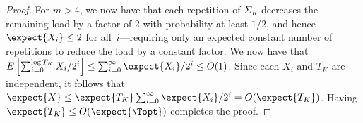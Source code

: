 {\begin{proof}
  For $m >4$, we now have that each repetition of $\Sigma_K$ decreases
  the remaining load by a factor of 2 with probability at least $1/2$,
  and hence $\expect{X_i} \leq 2$ for all~$i$---requiring only an
  expected constant number of repetitions to reduce the load by a
  constant factor.  We now have that $E\left[\sum_{i=0}^{\log T_K} X_i
    / 2^i\right] \leq \sum_{i=0}^{\infty} \expect{X_i}/2^i \leq O(1)$.
  Since each $X_i$ and $T_K$ are independent, it follows that
  $\expect{X} \leq \expect{T_K} \sum_{i=0}^{\infty} \expect{X_i}/2^i =
  O(\expect{T_K})$.  Having $\expect{T_K} \leq O(\expect{\Topt})$
  completes the proof.
\end{proof}
}
